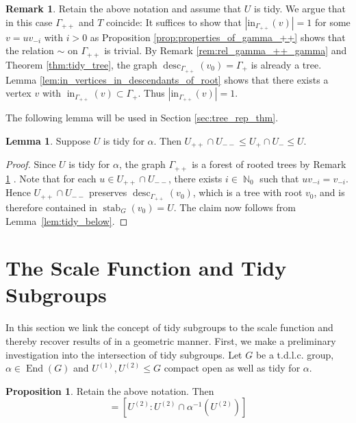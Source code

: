 \documentclass{article}
\DeclareMathOperator\stab{stab}
\DeclareMathOperator\End{End}
\DeclareMathOperator\desc{desc}
\DeclareMathOperator\bbN{\mathbb{N}}
\theoremstyle{definition}
\newtheorem{lemma}[theorem]{Lemma}
\newtheorem{proposition}[theorem]{Proposition}
\newtheorem{remark}[theorem]{Remark}
\begin{document}
\begin{remark}\label{rem:gamma_++_tidy}
Retain the above notation and assume that $U$ is tidy. We argue that in this case $\Gamma_{++}$ and $T$ coincide: It suffices to show that $|\mathrm{in}_{\Gamma_{++}}(v)| = 1$ for some $v = uv_{-i}$ with $i > 0$ as Proposition \ref{prop:properties_of_gamma_++} shows that the relation $\sim$ on $\Gamma_{++}$ is trivial. By Remark \ref{rem:rel_gamma_++_gamma} and Theorem \ref{thm:tidy_tree}, the graph $\desc_{\Gamma_{++}}(v_{0})=\Gamma_{+}$ is already a tree. Lemma \ref{lem:in_vertices_in_descendants_of_root} shows that there exists a vertex $v$ with $\operatorname{in}_{\Gamma_{++}}(v)\subset \Gamma_{+}$. Thus $|\mathrm{in}_{\Gamma_{++}}(v)| = 1$.
\end{remark}

The following lemma will be used in Section \ref{sec:tree_rep_thm}.

\begin{lemma}\label{lem:pseudo_nub}
Suppose $U$ is tidy for $\alpha$. Then $U_{++}\cap U_{--}\le U_+\cap U_-\le U$.
\end{lemma}

\begin{proof}
Since $U$ is tidy for $\alpha$, the graph $\Gamma_{++}$ is a forest of rooted trees by Remark \ref{rem:gamma_++_tidy} . Note that for each $u\in U_{++}\cap U_{--}$, there exists $i\in \bbN_{0}$ such that $uv_{-i} = v_{-i}$. Hence $U_{++}\cap U_{--}$ preserves $\desc_{\Gamma_{++}}(v_0)$, which is a tree with root $v_0$, and is therefore contained in $\stab_{G}(v_{0})=U$. The claim now follows from Lemma~\ref{lem:tidy_below}.
\end{proof}


\section{The Scale Function and Tidy Subgroups}\label{sec:scale_function}

In this section we link the concept of tidy subgroups to the scale function and thereby recover results of \cite{Wil15} in a geometric manner. First, we make a preliminary investigation into the intersection of tidy subgroups. Let $G$ be a t.d.l.c. group, $\alpha\in\End(G)$ and $U^{(1)},U^{(2)}\le G$ compact open as well as tidy for $\alpha$.

\begin{proposition}\label{prop:tidy_subgroups_index_equal}
Retain the above notation. Then
\begin{displaymath}
 [U^{(1)}:U^{(1)}\cap \alpha^{-1}(U^{(1)})] = [U^{(2)}:U^{(2)}\cap \alpha^{-1}(U^{(2)})]
\end{displaymath}
\end{proposition}
\end{document}
